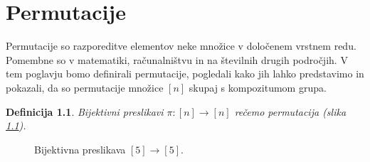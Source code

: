 \documentclass[a4paper, 12pt]{book}
\newtheorem{definicija}{Definicija}[chapter]
\begin{document}
\chapter{ Permutacije }

Permutacije so razporeditve elementov neke množice v določenem vrstnem redu. Pomembne so v matematiki, računalništvu in na številnih drugih področjih. V tem poglavju bomo definirali permutacije, pogledali kako jih lahko predstavimo in pokazali, da so permutacije množice $[n]$ skupaj s kompozitumom grupa.

\begin{definicija}
Bijektivni preslikavi $\pi: [n] \rightarrow [n]$ rečemo permutacija (slika \ref{bijektivna_preslikava_n_n}).
\end{definicija}
\begin{figure}[h]
    \begin{center}        
    \end{center}
    \caption{Bijektivna preslikava $[5] \rightarrow [5]$.}
    \label{bijektivna_preslikava_n_n}
\end{figure}
\end{document}
